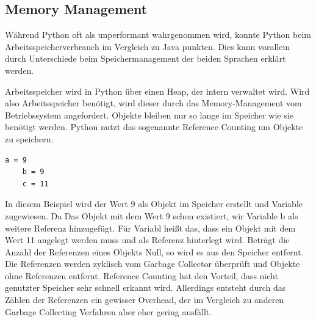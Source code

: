 \subsection{Memory Management}
Während Python oft als unperformant wahrgenommen wird, konnte Python beim Arbeitsspeicherverbrauch im Vergleich 
zu Java punkten. Dies kann vorallem durch Unterschiede beim Speichermanagement der beiden Sprachen erklärt werden. 

Arbeitsspeicher wird in Python über einen Heap, der intern verwaltet wird. Wird also Arbeitsspeicher benötigt, 
wird dieser durch das Memory-Management vom Betriebssystem angefordert. Objekte bleiben nur so lange im Speicher 
wie sie benötigt werden. Python nutzt das sogenannte Reference Counting um Objekte zu speichern.

\begin{lstlisting}[caption={Codebeispiel zur Verwaltung von Objekten in Python}]
    a = 9
    b = 9
    c = 11
\end{lstlisting}

In diesem Beispiel wird der Wert 9 als Objekt im Speicher erstellt und Variable  zugewiesen. Da 
Das Objekt mit dem Wert 9 schon existiert, wir Variable {b} als weitere Referenz hinzugefügt. Für Variabl 
 heißt das, dass ein Objekt mit dem Wert 11 angelegt werden muss und  als Referenz hinterlegt wird. 
Beträgt die Anzahl der Referenzen eines Objekts Null, so wird es aus den Speicher entfernt. Die Referenzen 
werden zyklisch vom Garbage Collector überprüft und Objekte ohne Referenzen entfernt. Reference Counting 
hat den Vorteil, dass nicht genutzter Speicher sehr schnell erkannt wird. Allerdings entsteht durch das Zählen 
der Referenzen ein gewisser Overhead, der im Vergleich zu anderen Garbage Collecting Verfahren aber eher gering ausfällt.

